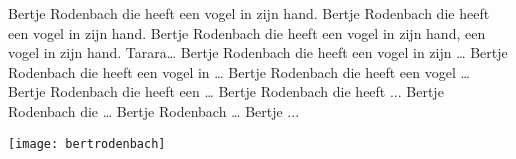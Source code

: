 \beginverse*
Bertje Rodenbach die heeft een vogel in zijn hand. 
Bertje Rodenbach die heeft een vogel in zijn hand.
Bertje Rodenbach die heeft een vogel in zijn hand, een vogel in zijn hand. Tarara…
\endverse
\beginverse
Bertje Rodenbach die heeft een vogel in zijn …
\endverse
\beginverse
Bertje Rodenbach die heeft een vogel in …
\endverse
\beginverse
Bertje Rodenbach die heeft een vogel …
\endverse
\beginverse
Bertje Rodenbach die heeft een …
\endverse
\beginverse
Bertje Rodenbach die heeft ...
\endverse
\beginverse
Bertje Rodenbach die …
\endverse
\beginverse
Bertje Rodenbach …
\endverse
\beginverse
Bertje ...
\endverse
\endsong
\begin{intersong}
    \texttt{[image: bertrodenbach]}
\end{intersong}
